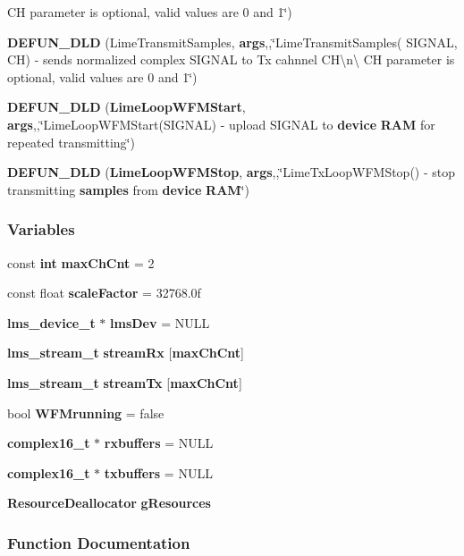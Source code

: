 \begin{DoxyCompactItemize}
CH parameter is optional, valid values are 0 and 1\char`\"{})
\item 
{\bf D\+E\+F\+U\+N\+\_\+\+D\+LD} (Lime\+Transmit\+Samples, {\bf args},,\char`\"{}Lime\+Transmit\+Samples( S\+I\+G\+N\+AL, CH) -\/ sends normalized complex S\+I\+G\+N\+AL to Tx cahnnel C\+H\textbackslash{}n\textbackslash{}
CH parameter is optional, valid values are 0 and 1\char`\"{})
\item 
{\bf D\+E\+F\+U\+N\+\_\+\+D\+LD} ({\bf Lime\+Loop\+W\+F\+M\+Start}, {\bf args},,\char`\"{}Lime\+Loop\+W\+F\+M\+Start(S\+I\+G\+N\+AL) -\/ upload S\+I\+G\+N\+AL to {\bf device} {\bf R\+AM} for repeated transmitting\char`\"{})
\item 
{\bf D\+E\+F\+U\+N\+\_\+\+D\+LD} ({\bf Lime\+Loop\+W\+F\+M\+Stop}, {\bf args},,\char`\"{}Lime\+Tx\+Loop\+W\+F\+M\+Stop() -\/ stop transmitting {\bf samples} from {\bf device} {\bf R\+AM}\char`\"{})
\end{DoxyCompactItemize}
\subsubsection*{Variables}
\begin{DoxyCompactItemize}
\item 
const {\bf int} {\bf max\+Ch\+Cnt} = 2
\item 
const float {\bf scale\+Factor} = 32768.\+0f
\item 
{\bf lms\+\_\+device\+\_\+t} $\ast$ {\bf lms\+Dev} = N\+U\+LL
\item 
{\bf lms\+\_\+stream\+\_\+t} {\bf stream\+Rx} [{\bf max\+Ch\+Cnt}]
\item 
{\bf lms\+\_\+stream\+\_\+t} {\bf stream\+Tx} [{\bf max\+Ch\+Cnt}]
\item 
bool {\bf W\+F\+Mrunning} = false
\item 
{\bf complex16\+\_\+t} $\ast$ {\bf rxbuffers} = N\+U\+LL
\item 
{\bf complex16\+\_\+t} $\ast$ {\bf txbuffers} = N\+U\+LL
\item 
{\bf Resource\+Deallocator} {\bf g\+Resources}
\end{DoxyCompactItemize}


\subsubsection{Function Documentation}
